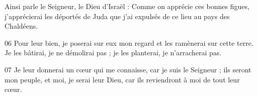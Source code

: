 Ainsi parle le Seigneur, le Dieu d’Israël : Comme on apprécie ces bonnes figues, j’apprécierai les déportés de Juda que j’ai expulsés de ce lieu au pays des Chaldéens.

06 Pour leur bien, je poserai sur eux mon regard et les ramènerai sur cette terre. Je les bâtirai, je ne démolirai pas ; je les planterai, je n’arracherai pas.

07 Je leur donnerai un cœur qui me connaisse, car je suis le Seigneur ; ils seront mon peuple, et moi, je serai leur Dieu, car ils reviendront à moi de tout leur cœur.